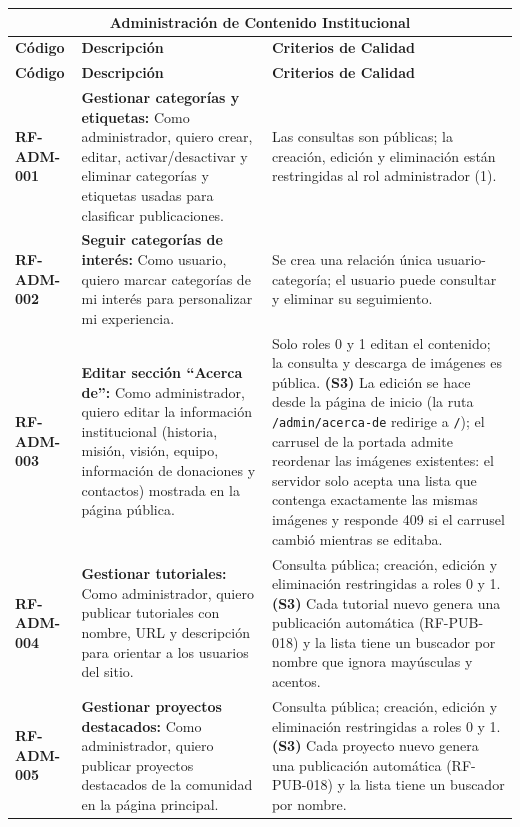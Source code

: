 \begin{longtable}{|l||p{7cm}|p{4.5cm}|}

\multicolumn{3}{c}{Administración de Contenido Institucional}\\
\hline\hline
\textbf{Código} & \textbf{Descripción} & \textbf{Criterios de Calidad}\\
\hline
\endfirsthead
\textbf{Código} & \textbf{Descripción} & \textbf{Criterios de Calidad}\\
\hline\hline
\endhead

\textbf{RF-ADM-001} & \textbf{Gestionar categorías y etiquetas:} Como administrador, quiero crear, editar, activar/desactivar y eliminar categorías y etiquetas usadas para clasificar publicaciones. & Las consultas son públicas; la creación, edición y eliminación están restringidas al rol administrador (1). \\
\hline
\textbf{RF-ADM-002} & \textbf{Seguir categorías de interés:} Como usuario, quiero marcar categorías de mi interés para personalizar mi experiencia. & Se crea una relación única usuario-categoría; el usuario puede consultar y eliminar su seguimiento. \\
\hline
\textbf{RF-ADM-003} & \textbf{Editar sección ``Acerca de'':} Como administrador, quiero editar la información institucional (historia, misión, visión, equipo, información de donaciones y contactos) mostrada en la página pública. & Solo roles 0 y 1 editan el contenido; la consulta y descarga de imágenes es pública. \textbf{(S3)} La edición se hace desde la página de inicio (la ruta \texttt{/admin/acerca-de} redirige a \texttt{/}); el carrusel de la portada admite reordenar las imágenes existentes: el servidor solo acepta una lista que contenga exactamente las mismas imágenes y responde 409 si el carrusel cambió mientras se editaba. \\
\hline
\textbf{RF-ADM-004} & \textbf{Gestionar tutoriales:} Como administrador, quiero publicar tutoriales con nombre, URL y descripción para orientar a los usuarios del sitio. & Consulta pública; creación, edición y eliminación restringidas a roles 0 y 1. \textbf{(S3)} Cada tutorial nuevo genera una publicación automática (RF-PUB-018) y la lista tiene un buscador por nombre que ignora mayúsculas y acentos. \\
\hline
\textbf{RF-ADM-005} & \textbf{Gestionar proyectos destacados:} Como administrador, quiero publicar proyectos destacados de la comunidad en la página principal. & Consulta pública; creación, edición y eliminación restringidas a roles 0 y 1. \textbf{(S3)} Cada proyecto nuevo genera una publicación automática (RF-PUB-018) y la lista tiene un buscador por nombre. \\

\end{longtable}
